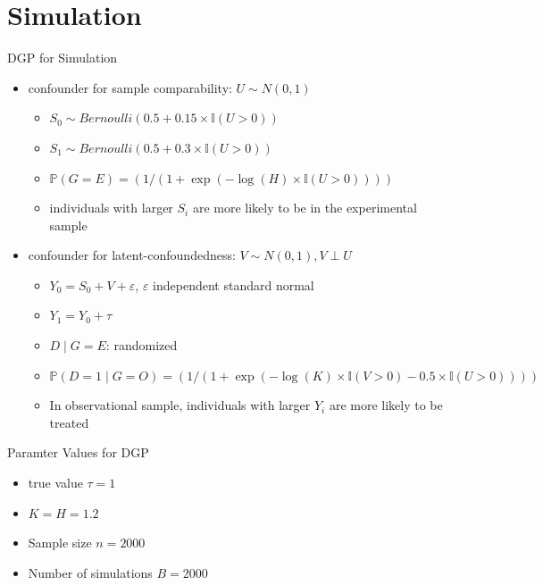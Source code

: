 \documentclass{beamer}					%
\begin{document}
\section{Simulation}
\begin{frame}{DGP for Simulation}
    \begin{itemize}
        \item confounder for sample comparability: $U \sim N(0,1)$
        \begin{itemize}
            \item $S_0 \sim Bernoulli(0.5 + 0.15 \times \mathbb{I}(U > 0))$
        \item $S_1 \sim Bernoulli(0.5 + 0.3 \times \mathbb{I}(U > 0))$
        \item $\mathbb{P}(G = E) = (1 / (1 + \exp (-\log(H) \times \mathbb{I}(U > 0) )))$
        \item individuals with larger $S_i$ are more likely to be in the experimental sample
        \end{itemize}
        
        \item confounder for latent-confoundedness: $V \sim N(0,1), V \perp U$
        \begin{itemize}
            \item $Y_0 = S_0 + V + \varepsilon$, $\varepsilon$ independent standard normal
        \item $Y_1 = Y_0 + \tau$
        \item $D \mid G = E$: randomized
        \item $\mathbb{P}(D = 1 \mid G = O) = (1 / (1 + \exp (-\log(K) \times \mathbb{I}(V > 0) - 0.5 \times \mathbb{I}(U > 0) )))$
        \item In observational sample, individuals with larger $Y_i$ are more likely to be treated
        \end{itemize}
    \end{itemize}
\end{frame}

\begin{frame}{Paramter Values for DGP}
    \begin{itemize}
        \item true value $\tau = 1$
        \item $K = H = 1.2$
        \item Sample size $n = 2000$ 
        \item Number of simulations $B = 2000$
    \end{itemize}
\end{frame}
\end{document}
